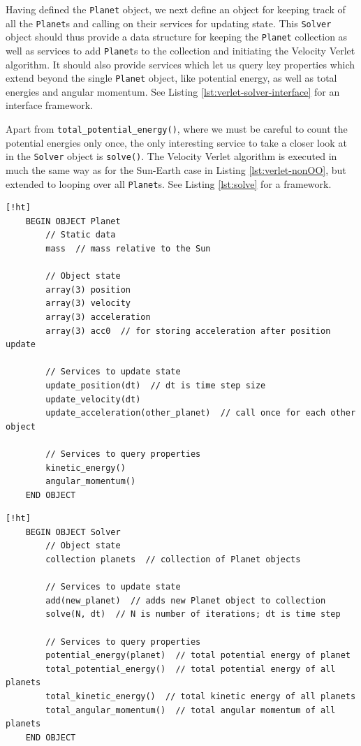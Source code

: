 \documentclass[]{article}
\begin{document}
Having defined the \lstinline|Planet| object, we next define an object for keeping track of all the \lstinline|Planet|s and calling on their services for updating state. This \lstinline|Solver| object should thus provide a data structure for keeping the \lstinline|Planet| collection as well as services to add \lstinline|Planet|s to the collection and initiating the Velocity Verlet algorithm. It should also provide services which let us query key properties which extend beyond the single \lstinline|Planet| object, like potential energy, as well as total energies and angular momentum. See Listing \ref{lst:verlet-solver-interface} for an interface framework.

Apart from \lstinline|total_potential_energy()|, where we must be careful to count the potential energies only once, the only interesting service to take a closer look at in the \lstinline|Solver| object is \lstinline|solve()|. The Velocity Verlet algorithm is executed in much the same way as for the Sun-Earth case in Listing \ref{lst:verlet-nonOO}, but extended to looping over all \lstinline|Planet|s. See Listing \ref{lst:solve} for a framework.

\begin{lstlisting}[caption={Planet object interface for Velocity Verlet algorithm solving the $n$-body problem.},label={lst:verlet-planet-interface}] [!ht]
	BEGIN OBJECT Planet
		// Static data
		mass  // mass relative to the Sun
		
		// Object state
		array(3) position
		array(3) velocity
		array(3) acceleration
		array(3) acc0  // for storing acceleration after position update
		
		// Services to update state
		update_position(dt)  // dt is time step size
		update_velocity(dt)  
		update_acceleration(other_planet)  // call once for each other object
		
		// Services to query properties
		kinetic_energy()
		angular_momentum()
	END OBJECT
\end{lstlisting}

\begin{lstlisting}[caption={Solver object interface for keeping track of the \lstinline|Planet| objects in the $n$-body problem, and manage the update of their state.},label={lst:verlet-solver-interface}] [!ht]
	BEGIN OBJECT Solver
		// Object state
		collection planets  // collection of Planet objects
		
		// Services to update state
		add(new_planet)  // adds new Planet object to collection
		solve(N, dt)  // N is number of iterations; dt is time step
		
		// Services to query properties
		potential_energy(planet)  // total potential energy of planet
		total_potential_energy()  // total potential energy of all planets
		total_kinetic_energy()  // total kinetic energy of all planets
		total_angular_momentum()  // total angular momentum of all planets
	END OBJECT
\end{lstlisting}
\end{document}
